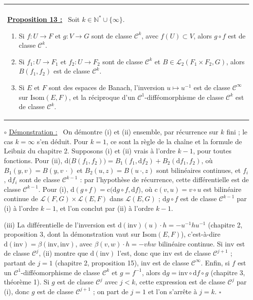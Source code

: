 \documentclass[a4paper,twoside]{report}
\makeatletter
\newenvironment{cadre}%
 {\par\vspace{2mm}\noindent\begin{tabular}{|@{\hspace{4mm}}p{0.93\textwidth}@{\hspace{4mm}}|}
  \hline \\[-2mm]}%
 {\\[2mm] \hline \end{tabular}\par\vspace{3mm}}
\newcommand{\propo}[1]{\textbf{\underline{Proposition #1 :}}~}
\newenvironment{demo}%
 {\par\needspace{4\baselineskip}\vspace{1mm}\noindent$\circ$ \underline{Démonstration :}~\setlength{\parskip}{3pt plus 1pt}}%
 {\hfill$\square$\par\vspace{2mm}}
\newcommand{\N}{\mathbb{N}}
\newcommand{\dd}{\mathrm{d}}                      %
\newcommand{\Cc}{\mathcal{C}}                     %
\newcommand{\Lc}{\mathcal{L}}                     %
\newcommand{\Isom}{\mathrm{Isom}}                 %
\makeatother
\begin{document}
\begin{cadre}
\propo{13} Soit $k \in \N^{*} \cup \{\infty\}$.
\begin{enumerate}[label=(\roman*),topsep=3pt,itemsep=2pt]
  \item Si $f : U \to F$ et $g : V \to G$ sont de classe $\Cc^{k}$, avec $f(U) \subset V$, alors $g \circ f$ est de classe $\Cc^{k}$.
  \item Si $f_{1} : U \to F_{1}$ et $f_{2} : U \to F_{2}$ sont de classe $\Cc^{k}$ et $B \in \Lc_{2}(F_{1} \times F_{2}, G)$, alors $B(f_{1}, f_{2})$ est de classe $\Cc^{k}$.
  \item Si $E$ et $F$ sont des espaces de Banach, l'inversion $u \mapsto u^{-1}$ est de classe $\Cc^{\infty}$ sur $\Isom(E, F)$, et la réciproque d'un $\Cc^{1}$-difféomorphisme de classe $\Cc^{k}$ est de classe $\Cc^{k}$.
\end{enumerate}
\end{cadre}

\begin{demo}
On démontre (i) et (ii) ensemble, par récurrence sur $k$ fini ; le cas $k = \infty$ s'en déduit. Pour $k = 1$, ce sont la règle de la chaîne et la formule de Leibniz du chapitre 2. Supposons (i) et (ii) vrais à l'ordre $k - 1$, pour toutes fonctions. Pour (ii), $\dd\big(B(f_{1}, f_{2})\big) = B_{1}(f_{1}, \dd f_{2}) + B_{2}(\dd f_{1}, f_{2})$, où $B_{1}(y, v) = B(y, v\,\cdot)$ et $B_{2}(u, z) = B(u\,\cdot, z)$ sont bilinéaires continues, et $f_{i}$, $\dd f_{i}$ sont de classe $\Cc^{k - 1}$ : par l'hypothèse de récurrence, cette différentielle est de classe $\Cc^{k - 1}$. Pour (i), $\dd(g \circ f) = \mathrm{c}\big(\dd g \circ f, \dd f\big)$, où $\mathrm{c}(v, u) = v \circ u$ est bilinéaire continue de $\Lc(F, G) \times \Lc(E, F)$ dans $\Lc(E, G)$ ; $\dd g \circ f$ est de classe $\Cc^{k - 1}$ par (i) à l'ordre $k - 1$, et l'on conclut par (ii) à l'ordre $k - 1$.

(iii) La différentielle de l'inversion est $\dd(\mathrm{inv})(u)\cdot h = -u^{-1}hu^{-1}$ (chapitre 2, proposition 3, dont la démonstration vaut sur $\Isom(E, F)$), c'est-à-dire $\dd(\mathrm{inv}) = \beta(\mathrm{inv}, \mathrm{inv})$, avec $\beta(v, w)\cdot h = -vhw$ bilinéaire continue. Si $\mathrm{inv}$ est de classe $\Cc^{j}$, (ii) montre que $\dd(\mathrm{inv})$ l'est, donc que $\mathrm{inv}$ est de classe $\Cc^{j + 1}$ ; partant de $j = 1$ (chapitre 2, proposition 15), $\mathrm{inv}$ est de classe $\Cc^{\infty}$. Enfin, si $f$ est un $\Cc^{1}$-difféomorphisme de classe $\Cc^{k}$ et $g = f^{-1}$, alors $\dd g = \mathrm{inv} \circ \dd f \circ g$ (chapitre 3, théorème 1). Si $g$ est de classe $\Cc^{j}$ avec $j < k$, cette expression est de classe $\Cc^{j}$ par (i), donc $g$ est de classe $\Cc^{j + 1}$ ; on part de $j = 1$ et l'on s'arrête à $j = k$.
\end{demo}
\end{document}
